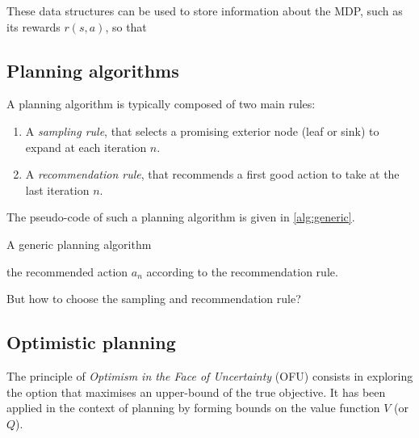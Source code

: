 \documentclass[runningheads]{llncs}
\begin{document}
These data structures can be used to store information about the MDP, such as its rewards $r(s, a)$, so that 


\subsection{Planning algorithms}

A planning algorithm is typically composed of two main rules:
\begin{enumerate}
	\item A \emph{sampling rule}, that selects a promising exterior node (leaf or sink) to expand at each iteration $n$.
	\item A \emph{recommendation rule}, that recommends a first good action to take at the last iteration $n$.
\end{enumerate}
The pseudo-code of such a planning algorithm is given in \autoref{alg:generic}.
\begin{algorithm}
	\caption{A generic planning algorithm}
	\label{alg:generic}
	\DontPrintSemicolon
	\Return the recommended action $a_{n}$ according to the recommendation rule.\;
\end{algorithm}

But how to choose the sampling and recommendation rule? 

\subsection{Optimistic planning}

The principle of \emph{Optimism in the Face of Uncertainty} (OFU) consists in exploring the option that maximises an upper-bound of the true objective. It has been applied in the context of planning by forming bounds on the value function $V$ (or $Q$).
\end{document}
